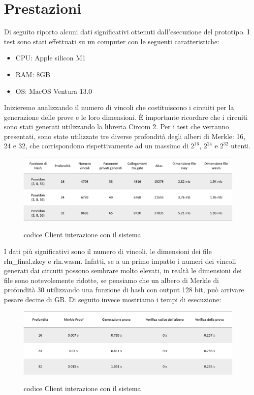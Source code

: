 \section{Prestazioni}
Di seguito riporto alcuni dati significativi ottenuti dall'esecuzione del prototipo. I test sono stati effettuati su un computer con le seguenti caratteristiche:
\begin{itemize}
    \item CPU: Apple silicon M1
    \item RAM: 8GB
    \item OS: MacOS Ventura 13.0
\end{itemize}

Inizieremo analizzando il numero di vincoli che costituiscono i circuiti per la generazione delle prove e le loro dimensioni. È importante ricordare che i circuiti sono stati generati utilizzando la libreria Circom 2. Per i test che verranno presentati, sono state utilizzate tre diverse profondità degli alberi di Merkle: 16, 24 e 32, che corrispondono rispettivamente ad un massimo di $2^{16}$, $2^{24}$ e $2^{32}$ utenti.
\begin{figure}[H]
    \centering
    \includegraphics[width=17cm]{./chapters/3.poc/images/5.1.bench.png}
    \label{fig:1.bench}
    \captionsetup{justification=centering}
    \caption{codice Client interazione con il sistema}
\end{figure}
I dati più significativi sono il numero di vincoli, le dimensioni dei file rln\_final.zkey e rln.wasm. Infatti, se a un primo impatto i numeri dei vincoli generati dai circuiti possono sembrare molto elevati, in realtà le dimensioni dei file sono notevolemente ridotte, se pensiamo che un albero di Merkle di profondità 30 utilizzando una funzione di hash con output 128 bit, può arrivare pesare decine di GB. Di seguito invece mostriamo i tempi di esecuzione:
\begin{figure}[H]
    \centering
    \includegraphics[width=17cm]{./chapters/3.poc/images/5.2.bench.png}
    \label{fig:2.bench}
    \captionsetup{justification=centering}
    \caption{codice Client interazione con il sistema}
\end{figure}

